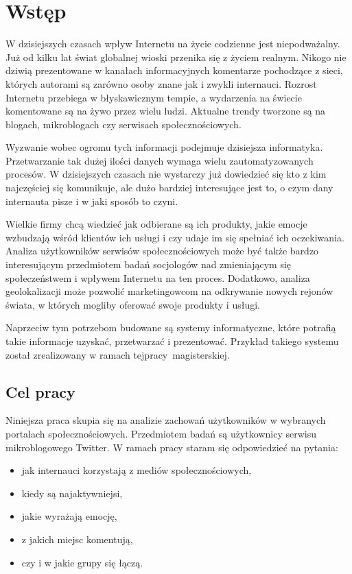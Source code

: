 \chapter{Wstęp}
W dzisiejszych czasach wpływ Internetu na życie codzienne jest niepodważalny.
Już od kilku lat świat globalnej wioski przenika się z życiem realnym.
Nikogo nie dziwią prezentowane w kanałach informacyjnych komentarze
pochodzące z sieci, których autorami są zarówno osoby znane jak i zwykli
internauci. Rozrost Internetu przebiega w błyskawicznym tempie, a wydarzenia na
świecie komentowane są na żywo przez wielu ludzi. Aktualne trendy tworzone są na
blogach, mikroblogach czy serwisach społecznościowych.

Wyzwanie wobec ogromu tych informacji podejmuje dzisiejsza informatyka.
Przetwarzanie tak dużej ilości danych wymaga wielu zautomatyzowanych procesów.
W dzisiejszych czasach nie wystarczy już dowiedzieć się kto z kim najczęściej
się komunikuje, ale dużo bardziej interesujące jest to, o czym dany internauta
pisze i w jaki sposób to czyni.

Wielkie firmy chcą wiedzieć jak odbierane są ich produkty, jakie emocje
wzbudzają wśród klientów ich usługi i czy udaje im się spełniać ich oczekiwania.
Analiza użytkowników serwisów społecznościowych może być także bardzo
interesującym przedmiotem badań socjologów nad zmieniającym się społeczeństwem i
wpływem Internetu na ten proces.
Dodatkowo, analiza geolokalizacji może pozwolić marketingowcom na
odkrywanie nowych rejonów świata, w których mogliby oferować swoje
produkty i usługi.

Naprzeciw tym potrzebom budowane są systemy informatyczne, które potrafią takie
informacje uzyskać, przetwarzać i prezentować. Przykład takiego systemu został
zrealizowany w ramach tej\linebreak pracy~magisterskiej.

\section{Cel pracy}
Niniejsza praca skupia się na analizie zachowań użytkowników w wybranych
portalach społecznościowych. Przedmiotem badań są użytkownicy serwisu
mikroblogowego Twitter. W ramach pracy staram się
odpowiedzieć na pytania:
\begin{itemize}
  \item jak internauci korzystają z mediów społecznościowych,
  \item kiedy są najaktywniejsi,
  \item jakie wyrażają emocję,
  \item z jakich miejsc komentują,
  \item czy i w jakie grupy się łączą.
\end{itemize}

